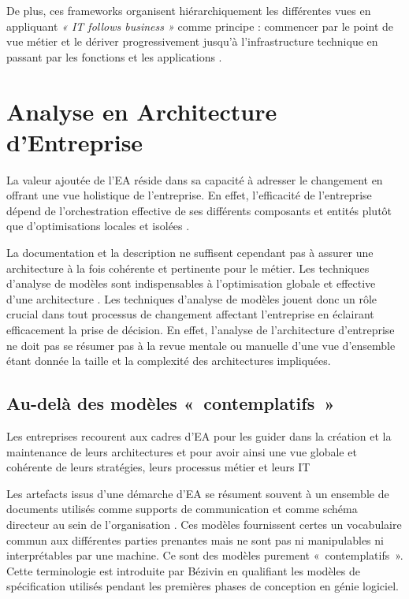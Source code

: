 De plus, ces frameworks organisent hiérarchiquement les différentes vues en
appliquant \emph{« IT follows business »} comme principe : commencer par le
point de vue métier et le dériver progressivement jusqu'à l'infrastructure
technique en passant par les fonctions et les applications
\cite{winter2006essential}.

\section{Analyse en Architecture d'Entreprise}

La valeur ajoutée de l'EA réside dans sa capacité à adresser le changement en
offrant une vue holistique de l'entreprise. En effet, l'efficacité de
l'entreprise dépend de l'orchestration effective de ses différents composants
et entités plutôt que d'optimisations locales et isolées
\cite{nadler1992organizational}. 

La documentation et la description ne suffisent cependant pas à assurer une
architecture à la fois cohérente et pertinente pour le métier. Les techniques
d'analyse de modèles sont indispensables à l'optimisation globale et effective
d'une architecture \cite{lankhorst2013enterprise}. Les techniques d'analyse de
modèles jouent donc un rôle crucial dans tout processus de changement affectant
l'entreprise en éclairant efficacement la prise de décision. En effet,
l'analyse de l'architecture d'entreprise ne doit pas se résumer pas à la revue
mentale ou manuelle d'une vue d'ensemble étant donnée la taille et la
complexité des architectures impliquées.

\subsection{Au-delà des modèles «~contemplatifs~»}

Les entreprises recourent aux cadres d'EA pour les guider dans la création et
la maintenance de leurs architectures et pour avoir ainsi une vue globale et
cohérente de leurs stratégies, leurs processus métier et leurs IT 

Les artefacts issus d'une démarche d'EA se résument souvent à un ensemble de
documents utilisés comme supports de communication et comme schéma directeur au
sein de l'organisation \cite{kulkarni_modelling_2013}
\cite{clark_towards_2014}.  Ces modèles fournissent certes un vocabulaire
commun aux différentes parties prenantes mais ne sont pas ni manipulables ni
interprétables par une machine. Ce sont des modèles purement «~contemplatifs~».
Cette terminologie est introduite par Bézivin en qualifiant les modèles de
spécification utilisés pendant les premières phases de conception en génie
logiciel. 

